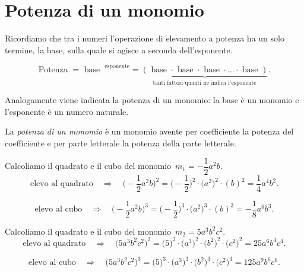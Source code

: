 \ovalbox{\risolvii \ref{ese:10.12}, \ref{ese:10.13}, \ref{ese:10.14}, \ref{ese:10.15}}

\section{Potenza di un monomio}

Ricordiamo che tra i numeri l'operazione di elevamento a
potenza ha un solo termine, la base, sulla quale si agisce a seconda
dell'esponente.

\[\text{Potenza }=\text{ base }^\text{ esponente}= \underbrace{(\text{ base }\cdot \text{ base }\cdot\text{ base }\cdot\ldots\cdot \text{ base })}_{\text{tanti fattori quanti ne indica l'esponente}}.\]

Analogamente viene indicata la potenza di un monomio: la base è un
monomio e l'esponente è un numero naturale.

\begin{definizione}
La \emph{potenza di un monomio} è un monomio
avente per coefficiente la potenza del coefficiente e per parte
letterale la potenza della parte letterale.
\end{definizione}

\begin{exrig}
 \begin{esempio}
Calcoliamo il quadrato e il cubo del monomio~$m_{1}=-{\dfrac{1}{2}}a^{2}b$.
\[\text{elevo al quadrato}\quad\Rightarrow\quad\bigg(-{\frac{1}{2}}a^{2}b\bigg)^{2}
=\bigg(-{\frac{1}{2}}\bigg)^{2}\cdot\big(a^{2}\big)^{2}\cdot (b)^{2}=\frac{1}{4}a^{4}b^{2}.\]

\[\text{elevo al cubo}\quad\Rightarrow\quad\bigg(-{\frac{1}{2}}a^{2}b\bigg)^{3}
=\bigg(-{\frac{1}{2}}\bigg)^{3}\cdot\big(a^{2}\big)^{3}\cdot (b)^{3}
=-{\frac{1}{8}}a^{6}b^{3}.\]
 \end{esempio}

 \begin{esempio}
Calcoliamo il quadrato e il cubo del monomio~$m_{2}=5a^{3}b^{2}c^{2}$.
\[\text{elevo al quadrato}\quad\Rightarrow\quad\big(5a^{3}b^{2}c^{2}\big)^{2}
=\big(5\big)^{2}\cdot \big(a^{3}\big)^{2}\cdot\big(b^{2}\big)^{2}\cdot \big(c^{2}\big)^{2}
=25a^{6}b^{4}c^{4}.\]

\[\text{elevo al cubo}\quad\Rightarrow\quad\big(5a^{3}b^{2}c^{2}\big)^{3}
=\big(5\big)^{3}\cdot \big(a^{3}\big)^{3}\cdot\big(b^{2}\big)^{3}\cdot \big(c^{2}\big)^{3}
=125a^{9}b^{6}c^{6}.\]
 \end{esempio}
\end{exrig}

